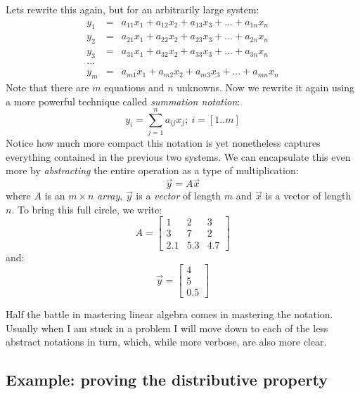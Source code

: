 \documentclass{article}
\begin{document}
Lets rewrite this again, but for an arbitrarily large system:
\begin{eqnarray}
y_1 & = & a_{11} x_1 + a_{12} x_2 + a_{13} x_3 + ... + a_{1n} x_n \\
y_2 & = & a_{21} x_1 + a_{22} x_2 + a_{23} x_3 + ... + a_{2n} x_n \\
y_3 & = & a_{31} x_1 + a_{32} x_2 + a_{33} x_3 + ... + a_{3n} x_n \\ \nonumber
... \\
y_m & = & a_{m1} x_1 + a_{m2} x_2 + a_{m3} x_3 + ... + a_{mn} x_n
\end{eqnarray}
Note that there are $m$ equations and $n$ unknowns.
Now we rewrite it again using a more powerful technique called 
{\it summation notation}:
\begin{equation}
y_i = \sum_{j=1}^n a_{ij} x_j; ~ i=[1..m]
\end{equation}
Notice how much more compact this notation is yet nonetheless captures
everything contained in the previous two systems.
We can encapsulate this even more by {\it abstracting} the entire operation
as a type of multiplication:
\begin{equation}
\vec y = A \vec x
\label{matrix_vector_multiplication}
\end{equation}
where $A$ is an $m \times n$ {\it array}, $\vec y$ is a {\it vector} of length
$m$ and $\vec x$ is a vector of length $n$.
To bring this full circle, we write:
\begin{equation}
A = \left [ \begin{array}{lll}
1 & 2 & 3 \\
3 & 7 & 2 \\
2.1 & 5.3 & 4.7
\end{array}
\right ]
\end{equation}
and:
\begin{equation}
\vec y = \left [ \begin{array}{l}
4 \\
5 \\
0.5
\end{array}
\right ]
\end{equation}

Half the battle in mastering linear algebra comes in mastering the notation.
Usually when I am stuck in a problem I will move down to each of the less
abstract notations in turn, which, while more verbose, are also more clear.

\subsection{Example: proving the distributive property}
\end{document}
